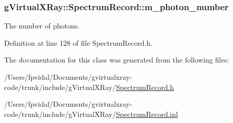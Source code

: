 \hypertarget{classg_virtual_x_ray_1_1_spectrum_record_aedc7cfa913f395b4517160647784f9e4}{
\subsubsection[{m\_\-photon\_\-number}]{ {\bf gVirtualXRay::SpectrumRecord::m\_\-photon\_\-number}}}
\label{classg_virtual_x_ray_1_1_spectrum_record_aedc7cfa913f395b4517160647784f9e4}


The number of photons. 



Definition at line 128 of file SpectrumRecord.h.



The documentation for this class was generated from the following files:\begin{DoxyCompactItemize}
\item 
/Users/fpvidal/Documents/gvirtualxray-\/code/trunk/include/gVirtualXRay/\hyperlink{_spectrum_record_8h}{SpectrumRecord.h}\item 
/Users/fpvidal/Documents/gvirtualxray-\/code/trunk/include/gVirtualXRay/\hyperlink{_spectrum_record_8inl}{SpectrumRecord.inl}\end{DoxyCompactItemize}
